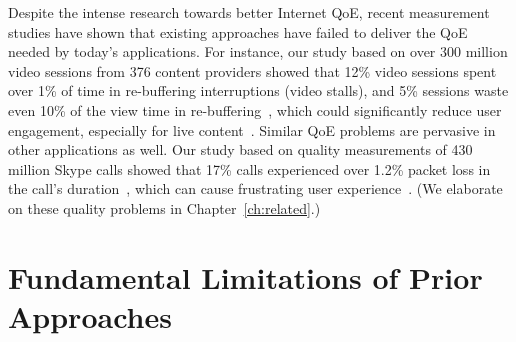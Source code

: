 Despite the intense research towards better Internet QoE, 
recent measurement studies have shown that existing approaches have failed 
to deliver the QoE needed by today's applications. 
For instance, our study based on over 300 million 
video sessions from 376 content providers showed that
12\% video sessions spent over 1\% of time in re-buffering interruptions (video stalls),
and 5\% sessions waste even 10\% of the view time in 
re-buffering~\cite{jiang2013shedding}, which could significantly reduce user engagement, 
especially for live content~\cite{sigcomm11}. 
Similar QoE problems are pervasive in other applications as well. 
Our study based on quality measurements of 430 million 
Skype calls showed that 17\% calls experienced over 
1.2\% packet loss in the call's duration~\cite{via}, which 
can cause frustrating user experience~\cite{itu,cisco-voip}.
(We elaborate on these quality problems in Chapter~\ref{ch:related}.)



\section{Fundamental Limitations of Prior Approaches}


